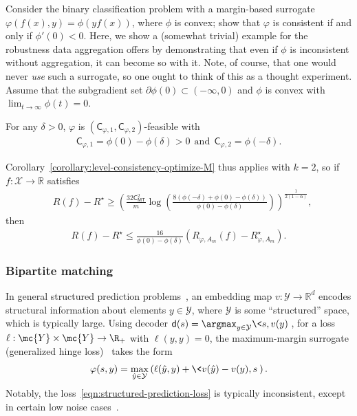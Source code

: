 \documentclass[11pt]{article}
\newcommand{\prn}[1]{\left({#1}\right)} %
\newcommand{\constant}{\mathsf{C}}  %
\newcommand{\cstMT}{\constant_{\mathsf{MT}}}
\newcommand{\pred}{\mathsf{d}}  %
\newcommand{\sX}{\mathcal{X}} %
\newcommand{\sY}{\mathcal{Y}} %
\newcommand{\tloss}{\ell}  %
\newcommand{\sloss}{\varphi}  %
\begin{document}
Consider the binary classification problem with a margin-based
surrogate $\sloss(f(x), y) = \phi(yf(x))$, where $\phi$ is convex;
\citet{BartlettJoMc06} show that $\sloss$ is consistent if and
only if $\phi'(0) < 0$.
%
Here, we show a (somewhat trivial) example for the robustness data
aggregation offers by demonstrating that even if $\phi$ is inconsistent
without aggregation, it can become so with it.
%
Note, of course, that one would never \emph{use} such a surrogate, so
one ought to think of this as a thought experiment.
%
Assume that the subgradient set $\partial \phi(0) \subset (-\infty, 0)$ and
$\phi$ is convex with $\lim_{t \to \infty} \phi(t) = 0$.
\begin{lemma}
  \label{lemma:binary-feasible}
  For any $\delta > 0$,
  $\sloss$ is $(\constant_{\sloss, 1}, \constant_{\sloss, 2})$-feasible with
  \begin{align*}
    \constant_{\sloss, 1} = \phi(0) - \phi(\delta) > 0
    ~~ \mbox{and} ~~ \constant_{\sloss, 2} = \phi(-\delta).
  \end{align*}
\end{lemma}
Corollary~\ref{corollary:level-consistency-optimize-M} thus applies with
$k=2$,
so if $f:\sX \to \mathbb{R}$ satisfies
\begin{align*}
  & R(f) - R^\star \geq	\prn{\frac{32 \cstMT^2}{m}\log \prn{ \frac{8(\phi(-\delta) + \phi(0) - \phi(\delta))}{\phi(0) - \phi(\delta)}}}^{\frac{1}{2(1-\alpha)}},
\end{align*}
then
\begin{align*}
  R(f) - R^\star \leq \frac{16}{\phi(0) - \phi(\delta)}(R_{\sloss, A_m}(f) - R_{\sloss, A_m}^\star).
\end{align*}

\subsubsection{Bipartite matching}

In general structured prediction problems~\citep{NowozinLa11}, an embedding
map $v: \sY \to \mathbb{R}^d$ encodes structural information about
elements $y \in \sY$, where $\sY$ is some ``structured''
space, which is typically large.
%
Using decoder $\pred(s) = \argmax_{y \in \sY} \< s, v(y)\>$, for a loss
$\tloss : \mc{Y} \times \mc{Y} \to \R_+$ with $\tloss(y, y) = 0$, the
maximum-margin surrogate (generalized hinge loss)~\citep{TaskarGuKo03,
  TsochantaridisHoJoAl04, Joachims06} takes the form
\begin{align}
  \label{eqn:structured-prediction-loss}
  \sloss(s, y) = \max_{\hat y \in \sY}
  \prn{\tloss(\hat y, y) + \<  v(\hat y) - v(y), s \> }.
\end{align}
Notably, the loss~\eqref{eqn:structured-prediction-loss} is typically
inconsistent, except in certain low noise cases~\citep{OsokinBaLa17,
  NowakBaRu20}.
\end{document}
